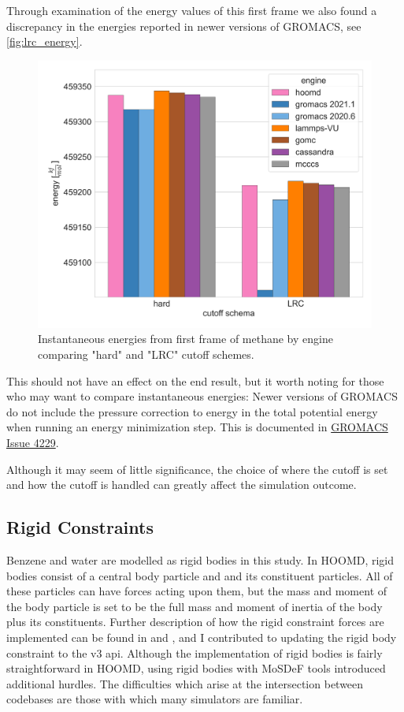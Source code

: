 Through examination of the energy values of this first frame we also found a discrepancy in the energies reported in newer versions of GROMACS, see \autoref{fig:lrc_energy}.
\begin{figure}[h!]
    \centering
    \includegraphics[width=0.8\linewidth,keepaspectratio]{figures/rep_study/lrc_energy.png}
    \caption{Instantaneous energies from first frame of methane by engine comparing "hard" and "LRC" cutoff schemes.}\label{fig:lrc_energy}
\end{figure}
This should not have an effect on the end result, but it worth noting for those who may want to compare instantaneous energies:
Newer versions of GROMACS do not include the pressure correction to energy in the total potential energy when running an energy minimization step. 
This is documented in \href{https://gitlab.com/gromacs/gromacs/-/issues/4229}{GROMACS Issue 4229}.

Although it may seem of little significance, the choice of where the cutoff is set and how the cutoff is handled can greatly affect the simulation outcome.

\subsection{Rigid Constraints}

Benzene and water are modelled as rigid bodies in this study.
In HOOMD, rigid bodies consist of a central body particle and and its constituent particles. 
All of these particles can have forces acting upon them, but the mass and moment of the body particle is set to be the full mass and moment of inertia of the body plus its constituents.  
Further description of how the rigid constraint forces are implemented can be found in \citet{Nguyen2011a} and \citet{Glaser2020a}, and I contributed to updating the rigid body constraint to the v3 api.
Although the implementation of rigid bodies is fairly straightforward in HOOMD, using rigid bodies with MoSDeF tools introduced additional hurdles. 
The difficulties which arise at the intersection between codebases are those with which many simulators are familiar.

